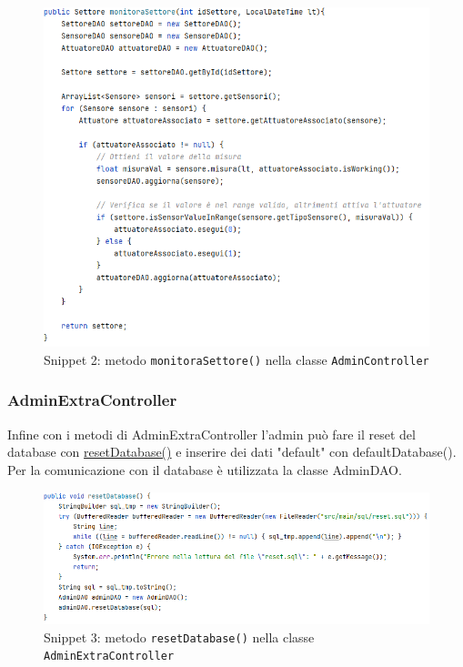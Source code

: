 \documentclass{article}
\newcommand{\code}[1]{\texttt{#1}}
\begin{document}
\begin{figure}[H]
    \centering
    \includegraphics[scale=0.5]{resources/images/Snippets/snippet_monitorasettore.png}
    \captionsetup{labelformat=empty, labelsep=none}
    \caption{Snippet 2: metodo \code{monitoraSettore()} nella classe \code{AdminController}}
    \label{fig:snippet_monitorasettore}
\end{figure}

\subsubsection{AdminExtraController}
Infine con i metodi di AdminExtraController l’admin può fare il reset del database con \hyperref[fig:snippet_resetdatabase]{resetDatabase()} e inserire dei dati "default" con defaultDatabase(). Per la comunicazione con il database è utilizzata la classe AdminDAO.

\begin{figure}[H]
    \centering
    \includegraphics[scale=0.5]{resources/images/Snippets/snippet_resetdatabase.png}
    \captionsetup{labelformat=empty, labelsep=none}
    \caption{Snippet 3: metodo \code{resetDatabase()} nella classe \code{AdminExtraController}}
    \label{fig:snippet_resetdatabase}
\end{figure}
\end{document}
